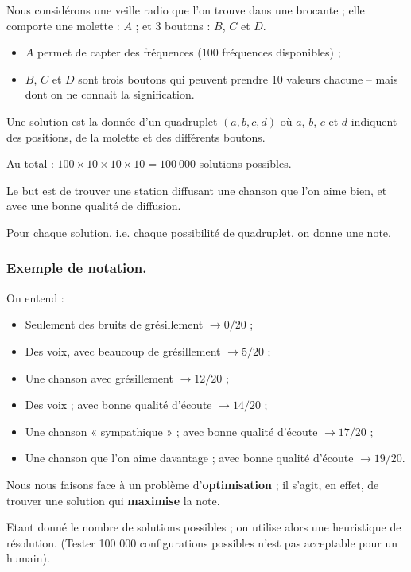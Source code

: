 

Nous considérons une veille radio que l’on trouve dans une brocante ; 
elle comporte une molette : $A$ ; et 3 boutons : $B$, $C$ et $D$.

\begin{itemize}
\item	$A$ permet de capter des fréquences (100 fréquences disponibles) ; 
\item	$B$, $C$ et $D$ sont trois boutons qui peuvent prendre 10 valeurs chacune 
	-- mais dont on ne connait la signification.
\end{itemize}

Une solution est la donnée d’un quadruplet $(a, b, c, d)$ 
où $a$, $b$, $c$ et $d$ indiquent des positions, 
de la molette
et des différents boutons.

Au total : $100 \times 10 \times 10 \times 10 = 100~000$ solutions possibles.

Le but est de trouver une station diffusant une chanson que l’on aime bien, et 
avec une bonne qualité de diffusion.

Pour chaque solution, i.e. chaque possibilité de quadruplet, on donne une note.


\subsubsection*{Exemple de notation.}

On entend :
\begin{itemize}
\item	Seulement des bruits de grésillement $\rightarrow 0/20$ ;
\item	Des voix, avec beaucoup de grésillement $\rightarrow 5/20$ ;
\item	Une chanson avec grésillement $\rightarrow 12/20$ ;
\item	Des voix ; avec bonne qualité d’écoute $\rightarrow 14/20$ ;
\item	Une chanson « sympathique » ; avec bonne qualité d’écoute $\rightarrow 17/20$ ;
\item	Une chanson que l’on aime davantage ; avec bonne qualité d’écoute $\rightarrow 19/20$.
\end{itemize}

Nous nous faisons face à un problème d’\textbf{optimisation} ; 
il s’agit, en effet, de trouver une solution qui \textbf{maximise} la note.

Etant donné le nombre de solutions possibles 
 ; on utilise alors une heuristique de résolution.
(Tester 100 000 configurations possibles n’est pas acceptable pour un humain).




